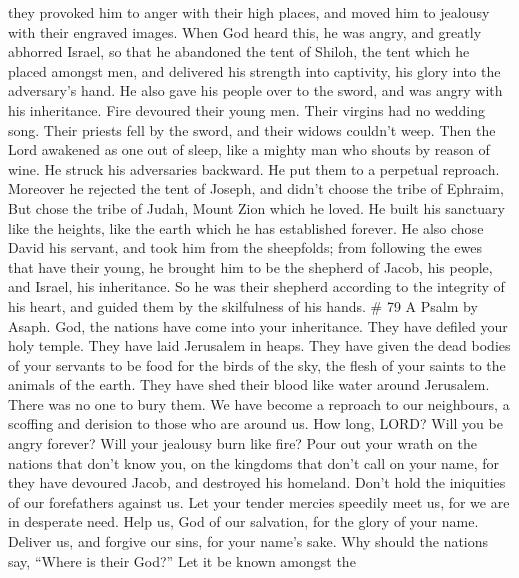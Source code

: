 they provoked him to anger with their high places, and moved him to
jealousy with their engraved images.  When God heard this,
he was angry, and greatly abhorred Israel,  so that he
abandoned the tent of Shiloh, the tent which he placed amongst men,
 and delivered his strength into captivity, his glory into
the adversary's hand.  He also gave his people over to the
sword, and was angry with his inheritance.  Fire devoured
their young men. Their virgins had no wedding song.  Their
priests fell by the sword, and their widows couldn't weep. 
Then the Lord awakened as one out of sleep, like a mighty man who shouts
by reason of wine.  He struck his adversaries backward. He
put them to a perpetual reproach.  Moreover he rejected the
tent of Joseph, and didn't choose the tribe of Ephraim, 
But chose the tribe of Judah, Mount Zion which he loved. 
He built his sanctuary like the heights, like the earth which he has
established forever.  He also chose David his servant, and
took him from the sheepfolds;  from following the ewes that
have their young, he brought him to be the shepherd of Jacob, his
people, and Israel, his inheritance.  So he was their
shepherd according to the integrity of his heart, and guided them by the
skilfulness of his hands. \# 79 A Psalm by Asaph.  God, the
nations have come into your inheritance. They have defiled your holy
temple. They have laid Jerusalem in heaps.  They have given
the dead bodies of your servants to be food for the birds of the sky,
the flesh of your saints to the animals of the earth.  They
have shed their blood like water around Jerusalem. There was no one to
bury them.  We have become a reproach to our neighbours, a
scoffing and derision to those who are around us.  How long,
LORD? Will you be angry forever? Will your jealousy burn like fire?
 Pour out your wrath on the nations that don't know you, on
the kingdoms that don't call on your name,  for they have
devoured Jacob, and destroyed his homeland.  Don't hold the
iniquities of our forefathers against us. Let your tender mercies
speedily meet us, for we are in desperate need.  Help us,
God of our salvation, for the glory of your name. Deliver us, and
forgive our sins, for your name's sake.  Why should the
nations say, ``Where is their God?'' Let it be known amongst the
